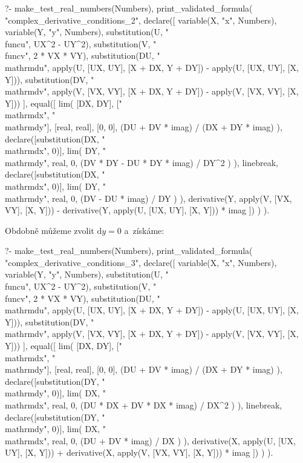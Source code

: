 \begin{prolog}
?-	make_test_real_numbers(Numbers),
	print_validated_formula(
		"complex_derivative_conditions_2",
		declare([
			variable(X, "x", Numbers),
			variable(Y, "y", Numbers),
			substitution(U, "\\func{u}", UX^2 - UY^2),
			substitution(V, "\\func{v}", 2 * VX * VY),
			substitution(DU, "\\mathrm{d}u", apply(U, [UX, UY], [X + DX, Y + DY]) - apply(U, [UX, UY], [X, Y])),
			substitution(DV, "\\mathrm{d}v", apply(V, [VX, VY], [X + DX, Y + DY]) - apply(V, [VX, VY], [X, Y]))
		],
			equal([
				lim(
					[DX, DY], ["\\mathrm{d}x", "\\mathrm{d}y"], [real, real], [0, 0],
					(DU + DV * imag) / (DX + DY * imag)
				),
				declare([substitution(DX, "\\mathrm{d}x", 0)],
					lim(
						DY, "\\mathrm{d}y", real, 0,
						(DV * DY - DU * DY * imag) / DY^2
					)
				),
				linebreak,
				declare([substitution(DX, "\\mathrm{d}x", 0)],
					lim(
						DY, "\\mathrm{d}y", real, 0,
						(DV - DU * imag) / DY
					)
				),
				derivative(Y, apply(V, [VX, VY], [X, Y])) - derivative(Y, apply(U, [UX, UY], [X, Y])) * imag
			])
		)
	).
\end{prolog}

Obdobně můžeme zvolit \(\mathrm{d}y = 0\) a~získáme:

\begin{prolog}
?-	make_test_real_numbers(Numbers),
	print_validated_formula(
		"complex_derivative_conditions_3",
		declare([
			variable(X, "x", Numbers),
			variable(Y, "y", Numbers),
			substitution(U, "\\func{u}", UX^2 - UY^2),
			substitution(V, "\\func{v}", 2 * VX * VY),
			substitution(DU, "\\mathrm{d}u", apply(U, [UX, UY], [X + DX, Y + DY]) - apply(U, [UX, UY], [X, Y])),
			substitution(DV, "\\mathrm{d}v", apply(V, [VX, VY], [X + DX, Y + DY]) - apply(V, [VX, VY], [X, Y]))
		],
			equal([
				lim(
					[DX, DY], ["\\mathrm{d}x", "\\mathrm{d}y"], [real, real], [0, 0],
					(DU + DV * imag) / (DX + DY * imag)
				),
				declare([substitution(DY, "\\mathrm{d}y", 0)],
					lim(
						DX, "\\mathrm{d}x", real, 0,
						(DU * DX + DV * DX * imag) / DX^2
					)
				),
				linebreak,
				declare([substitution(DY, "\\mathrm{d}y", 0)],
					lim(
						DX, "\\mathrm{d}x", real, 0,
						(DU + DV * imag) / DX
					)
				),
				derivative(X, apply(U, [UX, UY], [X, Y])) + derivative(X, apply(V, [VX, VY], [X, Y])) * imag
			])
		)
	).
\end{prolog}

